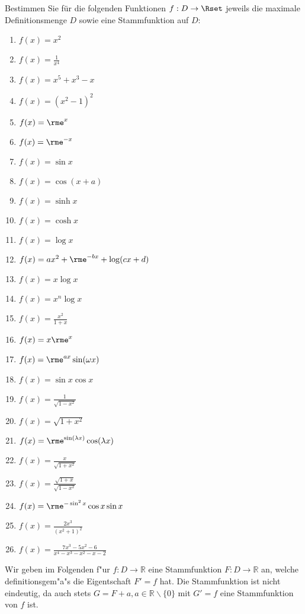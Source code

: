 \documentclass[11pt,answers]{exam}
\begin{document}
\begin{questions}

Bestimmen Sie für die folgenden Funktionen $f:D\to\Rset$ jeweils die maximale Definitionsmenge $D$ sowie eine Stammfunktion auf $D$:\\
\parbox{0.4\textwidth}{\begin{enumerate}
\item $f(x)=x^2$
\item $f(x)=\frac{1}{x^4}$
\item $f(x)=x^5+x^3-x$
\item $f(x)=(x^2-1)^2$
\item $f(x)=\rme^x$
\item $f(x)=\rme^{-x}$
\item $f(x)=\sin x$
\item $f(x)=\cos (x+a)$
\item $f(x)=\sinh x$
\item $f(x)=\cosh x$
\item $f(x)=\log x$
\item $f(x)=a x^2+\rme^{-bx}+\log (c x+d)$
\item $f(x)=x\log x$
\end{enumerate}}\parbox{0.6\textwidth}{\begin{enumerate}\setcounter{enumi}{13}
\item $f(x)=x^n\log x$
\item $f(x)=\frac{x^2}{1+x}$
\item $f(x)=x\rme^x$
\item $f(x)=\rme^{ax}\sin (\omega x)$
\item $f(x)=\sin x\cos x$
\item $f(x)=\frac{1}{\sqrt{1-x^2}}$
\item $f(x)=\sqrt{1+x^2}$
\item $f(x)=\rme^{\sin(\lambda x)}\cos(\lambda x)$
\item $f(x)=\frac{x}{\sqrt{1+x^2}}$
\item $f(x)=\frac{\sqrt{1+x}}{\sqrt{1-x^2}}$
\item $f(x)=\rme^{-\sin^2 x}\cos x\sin x$
\item $f(x)=\frac{2 x^3}{(x^2+1)^2}$
\item $f(x)=\frac{7 x^3-5 x^2-6}{x^4-x^3-x^2-x-2}$
\end{enumerate}}
\begin{solution}Wir geben im Folgenden f"ur $f:D\to\mathbb{R}$ eine Stammfunktion $F:D\to\mathbb{R}$ an, welche definitionsgem"a"s die Eigentschaft $F'=f$ hat. Die Stammfunktion ist nicht eindeutig, da auch stets $G=F+a,a\in\mathbb{R}\backslash\{0\}$ mit $G'=f$ eine Stammfunktion von $f$ ist.

\end{solution}
\end{questions}
\end{document}
